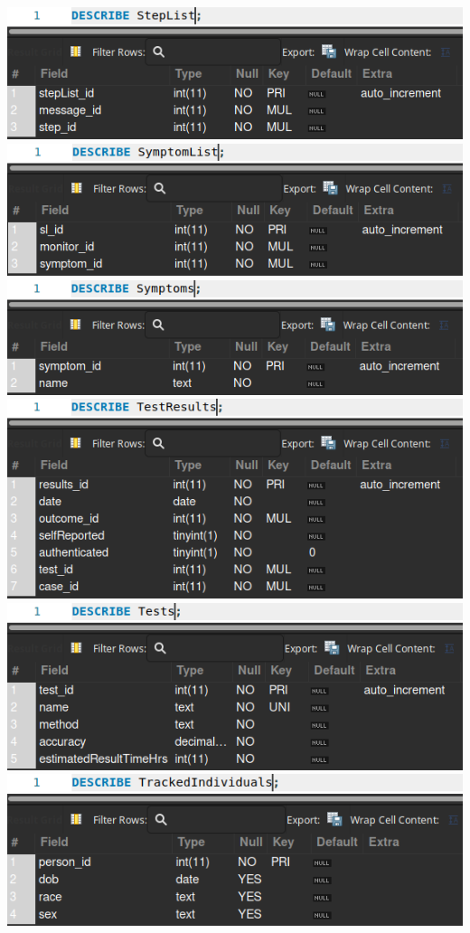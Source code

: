 \documentclass[
]{article}
\begin{document}
\includegraphics{imgs/Describe_StepList.png}\\
\includegraphics{imgs/Describe_SymptomList.png}\\
\includegraphics{imgs/Describe_Symptoms.png}\\
\includegraphics{imgs/Describe_TestResults.png}\\
\includegraphics{imgs/Describe_Tests.png}\\
\includegraphics{imgs/Describe_TrackedIndividuals.png}\\
\end{document}
